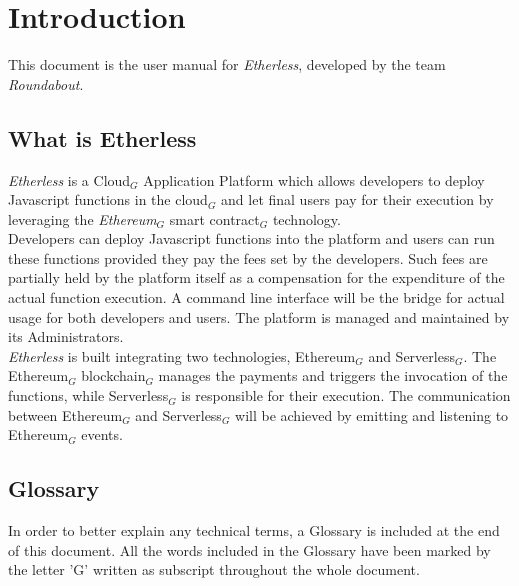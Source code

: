 \section{Introduction}
This document is the user manual for \textit{Etherless}, developed by the team \textit{Roundabout}.
\subsection{What is Etherless}
\textit{Etherless} is a Cloud$_{G}$ Application Platform which allows developers to deploy Javascript functions in the cloud$_{G}$ and let final users pay for their execution by leveraging the \textit{Ethereum$_{G}$} smart contract$_{G}$ technology.\\
Developers can deploy Javascript functions into the platform and users can run these functions provided they pay the fees set by the developers. Such fees are partially held by the platform itself as a compensation for the expenditure of the actual function execution. A command line interface will be the bridge for actual usage for both developers and users. The platform is managed and maintained by its Administrators.\\
\textit{Etherless} is built integrating two technologies, Ethereum$_{G}$ and Serverless$_{G}$. The Ethereum$_{G}$ blockchain$_{G}$ manages the payments and triggers the invocation of the functions, while Serverless$_{G}$ is responsible for their execution. The communication between Ethereum$_{G}$ and Serverless$_{G}$ will be achieved by emitting and listening to Ethereum$_{G}$ events.

\subsection{Glossary}
In order to better explain any technical terms, a Glossary is included at the end of this document. All the words included in the Glossary have been marked by the letter 'G' written as subscript throughout the whole document.